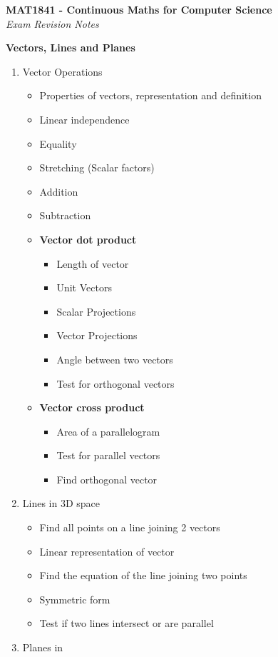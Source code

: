 \documentclass[10pt]{letter}
\makeatletter
\newcommand\mynobreakpar{\par\nobreak\@afterheading}
\makeatother
\begin{document}
\begin{center}
\textbf{MAT1841 - Continuous Maths for Computer Science}\\

\textit{Exam Revision Notes }\bigskip

\end{center}
\textbf{Vectors, Lines and Planes }
\mynobreakpar
\begin{enumerate}

\item Vector Operations
\begin{itemize}
\item Properties of vectors, representation and definition
\item Linear independence
\item Equality
\item Stretching (Scalar factors)
\item Addition 
\item Subtraction
\item \textbf{Vector dot product}
\begin{itemize}
\item Length of vector
\item Unit Vectors
\item Scalar Projections
\item Vector Projections
\item Angle between two vectors
\item Test for orthogonal vectors
\end{itemize}
\item \textbf{Vector cross product}
\begin{itemize}
\item Area of a parallelogram
\item Test for parallel vectors
\item Find orthogonal vector
\end{itemize}
\end{itemize}
\item Lines in 3D space
\begin{itemize}
\item Find all points on a line joining 2 vectors
\item Linear representation of vector
\item Find the equation of the line joining two points
\item Symmetric form
\item Test if two lines intersect or are parallel
\end{itemize}
\item Planes in 

\end{enumerate}
\end{document}
